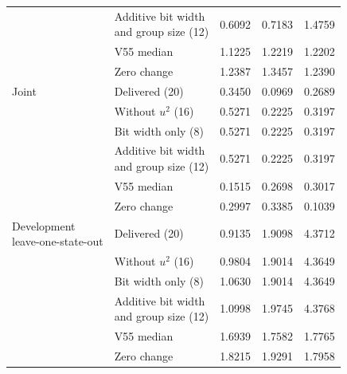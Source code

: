 \begin{table}[!htbp]
\begin{tabular*}{\textwidth}{@{\extracolsep{\fill}}llrrr@{}}
 & \shortstack[l]{Additive bit width\\and group size (12)} & 0.6092 & 0.7183 & 1.4759 \\
 & V55 median & 1.1225 & 1.2219 & 1.2202 \\
 & Zero change & 1.2387 & 1.3457 & 1.2390 \\
\addlinespace
Joint & Delivered (20) & 0.3450 & 0.0969 & 0.2689 \\
 & Without $u^2$ (16) & 0.5271 & 0.2225 & 0.3197 \\
 & Bit width only (8) & 0.5271 & 0.2225 & 0.3197 \\
 & \shortstack[l]{Additive bit width\\and group size (12)} & 0.5271 & 0.2225 & 0.3197 \\
 & V55 median & 0.1515 & 0.2698 & 0.3017 \\
 & Zero change & 0.2997 & 0.3385 & 0.1039 \\
\addlinespace
\shortstack[l]{Development\\leave-one-state-out} & Delivered (20) & 0.9135 & 1.9098 & 4.3712 \\
 & Without $u^2$ (16) & 0.9804 & 1.9014 & 4.3649 \\
 & Bit width only (8) & 1.0630 & 1.9014 & 4.3649 \\
 & \shortstack[l]{Additive bit width\\and group size (12)} & 1.0998 & 1.9745 & 4.3768 \\
 & V55 median & 1.6939 & 1.7582 & 1.7765 \\
 & Zero change & 1.8215 & 1.9291 & 1.7958 \\
\bottomrule
\end{tabular*}
\end{table}
